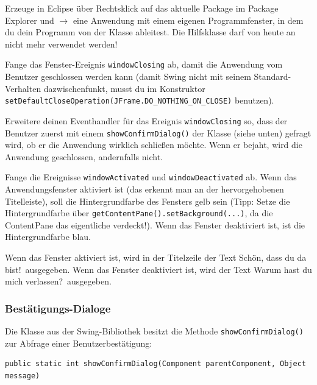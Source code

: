 \begin{compactenum}[a)]
\item Erzeuge in Eclipse über Rechtsklick auf das aktuelle Package im Package
Explorer und  $\rightarrow$  eine Anwendung mit einem
eigenen Programmfenster, in dem du dein Programm von der Klasse 
ableitest. Die Hilfsklasse  darf von heute an nicht mehr
verwendet werden!

Fange das Fenster-Ereignis \lstinline|windowClosing| ab, damit die Anwendung
vom Benutzer geschlossen werden kann (damit Swing nicht mit seinem
Standard-Verhalten dazwischenfunkt, musst du im Konstruktor
\lstinline|setDefaultCloseOperation(JFrame.DO_NOTHING_ON_CLOSE)| benutzen).

\item Erweitere deinen Eventhandler für das Ereignis \lstinline|windowClosing|
so, dass der Benutzer zuerst mit einem \lstinline|showConfirmDialog()| der
Klasse  (siehe unten) gefragt wird, ob er die Anwendung
wirklich schließen möchte. Wenn er bejaht, wird die Anwendung geschlossen,
andernfalls nicht.

\item Fange die Ereignisse \lstinline|windowActivated| und
\lstinline|windowDeactivated| ab. Wenn das Anwendungsfenster aktiviert ist (das
erkennt man an der hervorgehobenen Titelleiste), soll die Hintergrundfarbe des
Fensters gelb sein (Tipp: Setze die Hintergrundfarbe über
\lstinline|getContentPane().setBackground(...)|, da die ContentPane das
eigentliche  verdeckt!). Wenn das Fenster deaktiviert ist, ist
die Hintergrundfarbe blau.

\item Wenn das Fenster aktiviert ist, wird in der Titelzeile der Text
\glqq Schön, dass du da bist!\grqq\ ausgegeben. Wenn das Fenster deaktiviert
ist, wird der Text \glqq Warum hast du mich verlassen?\grqq\ ausgegeben.
\end{compactenum}

\subsubsection{Bestätigungs-Dialoge}

Die Klasse  aus der Swing-Bibliothek besitzt die Methode
\lstinline|showConfirmDialog()| zur Abfrage einer Benutzerbestätigung:

\begin{lstlisting}
public static int showConfirmDialog(Component parentComponent, Object message)
\end{lstlisting}

